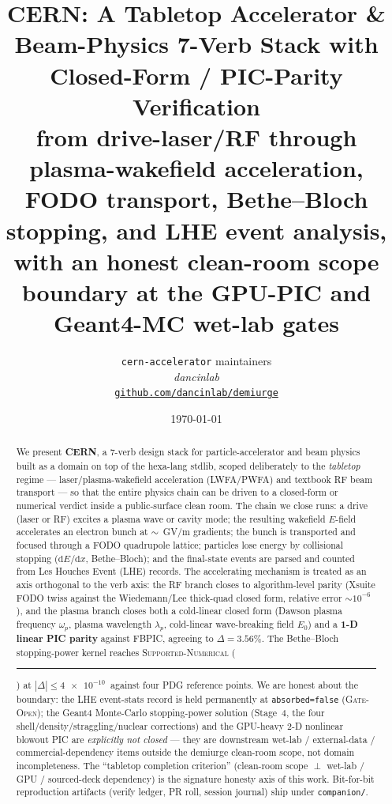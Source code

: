 \documentclass[11pt,a4paper]{article}
\title{
  \textbf{CERN: A Tabletop Accelerator \& Beam-Physics 7-Verb Stack
  with Closed-Form / PIC-Parity Verification} \\[6pt]
  \large from drive-laser/RF through plasma-wakefield acceleration,
  FODO transport, Bethe--Bloch stopping, and LHE event analysis,
  with an honest clean-room scope boundary at the GPU-PIC and
  Geant4-MC wet-lab gates
}
\author{
  \texttt{cern-accelerator} maintainers\\
  \normalsize\textit{dancinlab}\\[2pt]
  \normalsize\href{https://github.com/dancinlab/demiurge}{\texttt{github.com/dancinlab/demiurge}}
}
\date{\today}
\newcommand{\tierdisc}[1]{\textcolor{#1}{\rule[0.05ex]{1.0ex}{1.0ex}}}
\newcommand{\tierGreen}{\tierdisc{green!60!black}}
\begin{document}
\maketitle

\begin{abstract}
We present \textbf{CERN}, a 7-verb design stack for particle-accelerator
and beam physics built as a domain on top of the hexa-lang stdlib, scoped
deliberately to the \emph{tabletop} regime --- laser/plasma-wakefield
acceleration (LWFA/PWFA) and textbook RF beam transport --- so that the
entire physics chain can be driven to a closed-form or numerical verdict
inside a public-surface clean room. The chain we close runs: a drive
(laser or RF) excites a plasma wave or cavity mode; the resulting
wakefield $E$-field accelerates an electron bunch at $\sim$\SI{}{GV/m}
gradients; the bunch is transported and focused through a FODO quadrupole
lattice; particles lose energy by collisional stopping
($\mathrm{d}E/\mathrm{d}x$, Bethe--Bloch); and the final-state events are
parsed and counted from Les Houches Event (LHE) records. The accelerating
mechanism is treated as an axis orthogonal to the verb axis: the
RF branch closes to algorithm-level parity (Xsuite FODO twiss against the
Wiedemann/Lee thick-quad closed form, relative error
$\sim\!10^{-6}$), and the plasma branch closes both a cold-linear
closed form (Dawson plasma frequency $\omega_p$, plasma wavelength
$\lambda_p$, cold-linear wave-breaking field $E_0$) and a
\textbf{1-D linear PIC parity} against FBPIC, agreeing to
$\Delta\!=\!3.56\%$. The Bethe--Bloch stopping-power kernel reaches
\textsc{Supported-Numerical} (\tierGreen) at $|\Delta|\!\le\!\SI{4e-10}{}$
against four PDG reference points. We are honest about the boundary: the
LHE event-stats record is held permanently at \texttt{absorbed=false}
(\textsc{Gate-Open}); the Geant4 Monte-Carlo stopping-power solution
(Stage~4, the four shell/density/straggling/nuclear corrections) and the
GPU-heavy 2-D nonlinear blowout PIC are \emph{explicitly not closed} ---
they are downstream wet-lab / external-data / commercial-dependency items
outside the demiurge clean-room scope, not domain incompleteness. The
``tabletop completion criterion'' (clean-room scope $\perp$ wet-lab / GPU
/ sourced-deck dependency) is the signature honesty axis of this work.
Bit-for-bit reproduction artifacts (verify ledger, PR roll, session
journal) ship under \texttt{companion/}.
\end{abstract}
\end{document}
